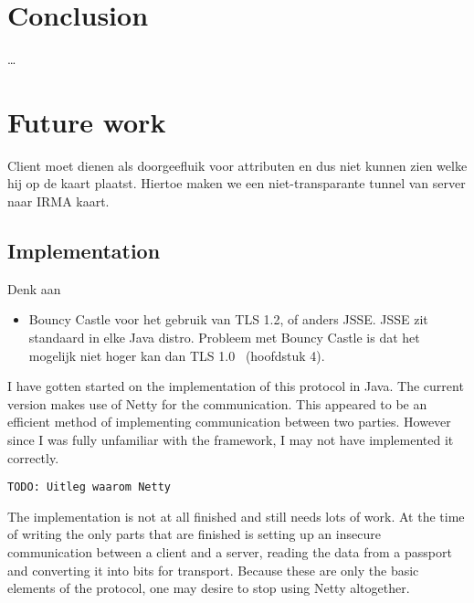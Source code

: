 \chapter{Conclusion}
\label{sec:conclusion}

\ldots

\chapter{Future work}
\label{sec:futurework}

Client moet dienen als doorgeefluik voor attributen en dus niet kunnen zien welke hij op de kaart plaatst. Hiertoe maken we een niet-transparante tunnel van server naar IRMA kaart.

\section{Implementation}
Denk aan
\begin{itemize}
	\item Bouncy Castle voor het gebruik van TLS 1.2, of anders JSSE. JSSE zit standaard in elke Java distro. Probleem met Bouncy Castle is dat het mogelijk niet hoger kan dan TLS 1.0~\cite{sslanalysis} (hoofdstuk 4). 
\end{itemize}

I have gotten started on the implementation of this protocol in Java. The current version makes use of Netty for the communication. This appeared to be an efficient method of implementing communication between two parties. However since I was fully unfamiliar with the framework, I may not have implemented it correctly.

\texttt{TODO: Uitleg waarom Netty}

The implementation is not at all finished and still needs lots of work. At the time of writing the only parts that are finished is setting up an insecure communication between a client and a server, reading the data from a passport and converting it into bits for transport. Because these are only the basic elements of the protocol, one may desire to stop using Netty altogether.
